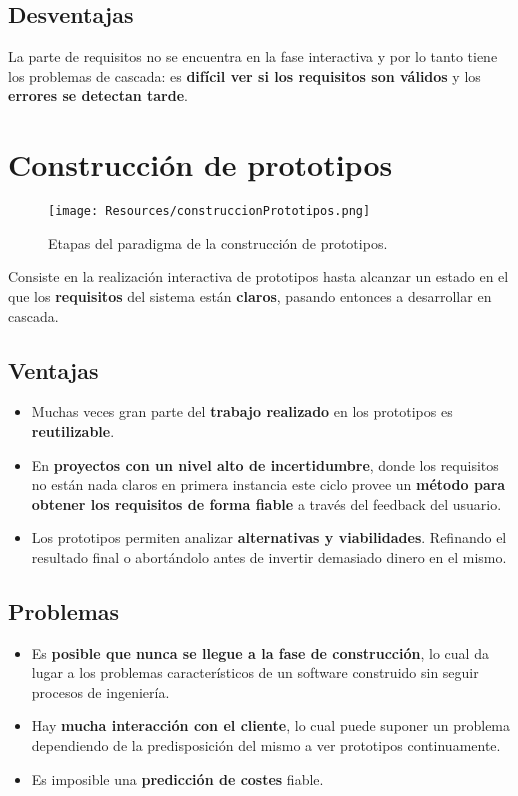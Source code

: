 \subsection{Desventajas}
La parte de requisitos no se encuentra en la fase interactiva y por lo tanto tiene los problemas de cascada: es \textbf{difícil ver si los requisitos son válidos} y los \textbf{errores se detectan tarde}.





\section{Construcción de prototipos}
\begin{figure}[H]
   \centering
   \texttt{[image: Resources/construccionPrototipos.png]}
   \caption{Etapas del paradigma de la construcción de prototipos.}
   \label{fig:construccionPrototipos}
\end{figure}

Consiste en la realización interactiva de prototipos hasta alcanzar un estado en el que los \textbf{requisitos} del sistema están \textbf{claros}, pasando entonces a desarrollar en cascada.\\


\subsection{Ventajas}

\begin{itemize}
   \item Muchas veces gran parte del \textbf{trabajo realizado} en los prototipos es \textbf{reutilizable}.
   \item En \textbf{proyectos con un nivel alto de incertidumbre}, donde los requisitos no están nada claros en primera instancia este ciclo provee un \textbf{método para obtener los requisitos de forma fiable} a través del feedback del usuario.
   \item Los prototipos permiten analizar \textbf{alternativas y viabilidades}. Refinando el resultado final o abortándolo antes de invertir demasiado dinero en el mismo.
\end{itemize}

\subsection{Problemas}
\begin{itemize}
   \item Es \textbf{posible que nunca se llegue a la fase de construcción}, lo cual da lugar a los problemas característicos de un software construido sin seguir procesos de ingeniería.
   \item Hay \textbf{mucha interacción con el cliente}, lo cual puede suponer un problema dependiendo de la predisposición del mismo a ver prototipos continuamente.
   \item Es imposible una \textbf{predicción de costes} fiable.
\end{itemize}



